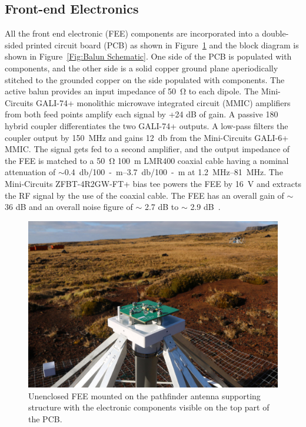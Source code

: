 \subsection{Front-end Electronics}\label{s:fee}

All the front end electronic (FEE) components are incorporated into a double-sided printed circuit board (PCB) as shown in Figure~\ref{Fig:balun} and the block diagram is shown in Figure~\ref{Fig:Balun Schematic}. One side of the PCB is populated with components, and the other side is a solid copper ground plane aperiodically stitched to the grounded copper on the side populated with components. The active balun provides an input impedance of \SI{50}{\ohm} to each dipole. The Mini-Circuits GALI-74+ monolithic microwave integrated circuit (MMIC) amplifiers from both feed points amplify each signal by +24 dB of gain. A passive {180\degree} hybrid coupler differentiates the two GALI-74+ outputs. A low-pass filters the coupler output by \SI{150}{\mega\hertz} and gains \SI{12}{\decibel} from the Mini-Circuits GALI-6+ MMIC. The signal gets fed to a second amplifier, and the output impedance of the FEE is matched to a \SI{50}{\ohm} \SI{100}{\meter} LMR400 coaxial cable having a nominal attenuation of $\sim$\SIrange{0.4}{3.7}{\decibel/100-m} at \SIrange{1.2}{81}{\mega\hertz}. The Mini-Circuits ZFBT-4R2GW-FT+ bias tee powers the FEE by \SI{16}{\volt} and extracts the RF signal by the use of the coaxial cable. The FEE has an overall gain of $\sim$ 36 dB and an overall noise figure of $\sim$ 2.7 dB to $\sim$ 2.9 dB~\citep{Memo35, 2012PASP..124.1090H}.

\begin{figure}
	\centering
	\includegraphics[width=\linewidth]{Figures/balun}
	\caption{Unenclosed FEE mounted on the pathfinder antenna supporting structure with the electronic components visible on the top part of the PCB.}
	\label{Fig:balun}
\end{figure}

